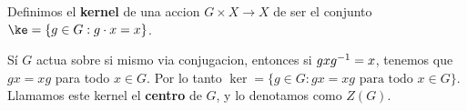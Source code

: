 \begin{definition}
    Definimos el \textbf{kernel} de una accion $G \times X \xrightarrow{} X$ de
    ser el conjunto $\ke=\{g \in G: g \cdot x=x\}$.
\end{definition}

\begin{example}\label{}
    S\'i $G$ actua sobre si mismo via conjugacion, entonces si  $gxg^{-1}=x$,
    tenemos que $gx=xg$ para todo  $x \in G$. Por lo tanto  $\ker=\{g \in G :
    gx=xg \text{ para todo } x \in G\}$. Llamamos este kernel el \textbf{centro}
    de $G$, y lo denotamos como  $Z(G)$.
\end{example}
